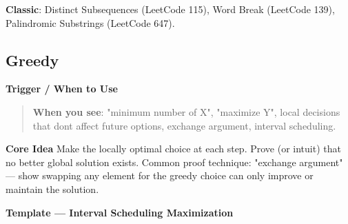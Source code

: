 \documentclass[11pt]{article}
\begin{document}
\textbf{Classic}: Distinct Subsequences (LeetCode 115), Word Break (LeetCode 139), Palindromic Substrings (LeetCode 647).

\subsection{Greedy}\label{greedy}

\textbf{Trigger / When to Use}

\begin{quote}
\textbf{When you see}: "minimum number of X", "maximize Y", local decisions that don\textquotesingle t affect future options, exchange argument, interval scheduling.
\end{quote}

\textbf{Core Idea}
Make the locally optimal choice at each step. Prove (or intuit) that no better global solution exists. Common proof technique: "exchange argument" --- show swapping any element for the greedy choice can only improve or maintain the solution.

\textbf{Template --- Interval Scheduling Maximization}

\end{document}
